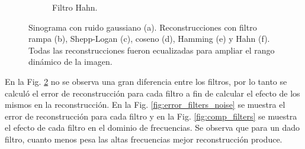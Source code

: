 \documentclass[letterpaper,12pt]{article}
\theoremstyle{plain}
\begin{document}
\begin{figure}[H]
\begin{subfigure}[h]{0.32\linewidth}
            \caption{Filtro Hahn.}
            \label{fig:noise_hahn}
      \end{subfigure}
   \caption{Sinograma con ruido gaussiano (a). Reconstrucciones con filtro rampa (b), Shepp-Logan (c), coseno (d), Hamming (e) y Hahn (f). Todas las reconstrucciones fueron ecualizadas para ampliar el rango dinámico de la imagen.}
   \label{fig:noise_vs_filters}
\end{figure}

En la Fig. \ref{fig:noise_vs_filters} no se observa una gran diferencia entre los filtros, por lo tanto se calculó el error de reconstrucción para cada filtro a fin de calcular el efecto de los mismos en la reconstrucción. En la Fig. \ref{fig:error_filters_noise} se muestra el error de reconstrucción para cada filtro y en la Fig. \ref{fig:comp_filters} se muestra el efecto de cada filtro en el dominio de frecuencias. Se observa que para un dado filtro, cuanto menos pesa las altas frecuencias mejor reconstrucción produce.
\end{document}
